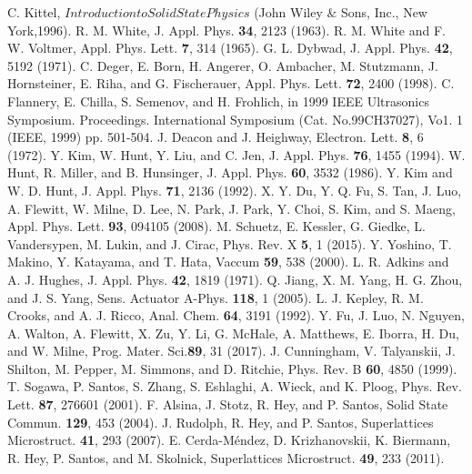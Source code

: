 \documentclass[aps,prb,amsmath,amssymb,footinbib,showpacs,superscriptaddress]{revtex4-1}%
\begin{document}
\begin{thebibliography}{9}
 C. Kittel, $Introduction to Solid State Physics$ (John Wiley \& Sons, Inc., New York,1996).
 R. M. White, J. Appl. Phys. \textbf{34}, 2123 (1963).
 R. M. White and F. W. Voltmer, Appl. Phys. Lett. \textbf{7}, 314 (1965).
 G. L. Dybwad, J. Appl. Phys. \textbf{42}, 5192 (1971).
 C. Deger, E. Born, H. Angerer, O. Ambacher, M. Stutzmann, J. Hornsteiner, E. Riha, and G. Fischerauer, Appl. Phys. Lett. \textbf{72}, 2400 (1998).
 C. Flannery, E. Chilla, S. Semenov, and H. Frohlich, in 1999  IEEE Ultrasonics Symposium. Proceedings. International Symposium (Cat. No.99CH37027), Vo1. 1 (IEEE, 1999) pp. 501-504.
 J. Deacon and J. Heighway, Electron. Lett. \textbf{8}, 6 (1972).
 Y. Kim, W. Hunt, Y. Liu, and C. Jen, J. Appl. Phys. \textbf{76}, 1455 (1994).
 W. Hunt, R. Miller, and B. Hunsinger, J. Appl. Phys. \textbf{60}, 3532 (1986).
 Y. Kim and W. D. Hunt, J. Appl. Phys. \textbf{71}, 2136 (1992).
 X. Y. Du, Y. Q. Fu, S. Tan, J. Luo, A. Flewitt, W. Milne, D. Lee, N. Park, J. Park, Y. Choi, S. Kim, and S. Maeng, Appl. Phys. Lett. \textbf{93}, 094105 (2008).
 M. Schuetz, E. Kessler, G. Giedke, L. Vandersypen, M. Lukin, and J. Cirac, Phys. Rev. X \textbf{5}, 1 (2015).
 Y. Yoshino, T. Makino, Y. Katayama, and T. Hata, Vaccum \textbf{59}, 538 (2000).
 L. R. Adkins and A. J. Hughes, J. Appl. Phys. \textbf{42}, 1819 (1971).
 Q. Jiang, X. M. Yang, H. G. Zhou, and J. S. Yang, Sens. Actuator A-Phys. \textbf{118}, 1 (2005).
 L. J. Kepley, R. M. Crooks, and A. J. Ricco, Anal. Chem. \textbf{64}, 3191 (1992).
 Y. Fu, J. Luo, N. Nguyen, A. Walton, A. Flewitt, X. Zu, Y. Li, G. McHale, A. Matthews, E. Iborra, H. Du, and W. Milne, Prog. Mater. Sci.\textbf{89}, 31 (2017).
 J. Cunningham, V. Talyanskii, J. Shilton, M. Pepper, M. Simmons, and D. Ritchie, Phys. Rev. B \textbf{60}, 4850 (1999).
 T. Sogawa, P. Santos, S. Zhang, S. Eshlaghi, A. Wieck, and K. Ploog, Phys. Rev. Lett. \textbf{87}, 276601 (2001).
 F. Alsina, J. Stotz, R. Hey, and P. Santos, Solid State Commun. \textbf{129}, 453 (2004).
 J. Rudolph, R. Hey, and P. Santos, Superlattices Microstruct. \textbf{41}, 293 (2007).
 E. Cerda-M\'endez, D. Krizhanovskii, K. Biermann, R. Hey, P. Santos, and M. Skolnick, Superlattices Microstruct. \textbf{49}, 233 (2011).

\end{thebibliography}
\end{document}
